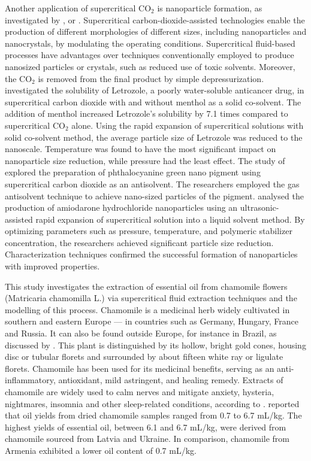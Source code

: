\documentclass[a4paper,fleqn]{cas-dc}
\begin{document}
	Another application of supercritical CO$_2$ is nanoparticle formation, as investigated by \citet{Padrela2018}, \citet{Franco2021} or \citet{Sodeifian2022}. Supercritical carbon-dioxide-assisted technologies enable the production of different morphologies of different sizes, including nanoparticles and nanocrystals, by modulating the operating conditions. Supercritical fluid-based processes have advantages over techniques conventionally employed to produce nanosized particles or crystals, such as reduced use of toxic solvents. Moreover, the CO$_2$ is removed from the final product by simple depressurization. 
	\citet{Sodeifian2018} investigated the solubility of Letrozole, a poorly water-soluble anticancer drug, in supercritical carbon dioxide with and without menthol as a solid co-solvent. The addition of menthol increased Letrozole's solubility by 7.1 times compared to supercritical CO$_2$ alone. Using the rapid expansion of supercritical solutions with solid co-solvent method, the average particle size of Letrozole was reduced to the nanoscale. Temperature was found to have the most significant impact on nanoparticle size reduction, while pressure had the least effect. 
	The study of \citet{SaadatiArdestani2020} explored the preparation of phthalocyanine green nano pigment using supercritical carbon dioxide as an antisolvent. The researchers employed the gas antisolvent technique to achieve nano-sized particles of the pigment.
	\citet{Sodeifian2019} analysed the production of amiodarone hydrochloride nanoparticles using an ultrasonic-assisted rapid expansion of supercritical solution into a liquid solvent method. By optimizing parameters such as pressure, temperature, and polymeric stabilizer concentration, the researchers achieved significant particle size reduction. Characterization techniques confirmed the successful formation of nanoparticles with improved properties.
	
	This study investigates the extraction of essential oil from chamomile flowers (Matricaria chamomilla L.) via supercritical fluid extraction techniques and the modelling of this process. Chamomile is a medicinal herb widely cultivated in southern and eastern Europe — in countries such as Germany, Hungary, France and Russia. It can also be found outside Europe, for instance in Brazil, as discussed by \citet{Singh2011}. This plant is distinguished by its hollow, bright gold cones, housing disc or tubular florets and surrounded by about fifteen white ray or ligulate florets. Chamomile has been used for its medicinal benefits, serving as an anti-inflammatory, antioxidant, mild astringent, and healing remedy. Extracts of chamomile are widely used to calm nerves and mitigate anxiety, hysteria, nightmares, insomnia and other sleep-related conditions, according to \citet{Srivastava2009}. \citet{Orav2010} reported that oil yields from dried chamomile samples ranged from 0.7 to 6.7 mL/kg. The highest yields of essential oil, between 6.1 and 6.7 mL/kg, were derived from chamomile sourced from Latvia and Ukraine. In comparison, chamomile from Armenia exhibited a lower oil content of 0.7 mL/kg.
	
\end{document}

